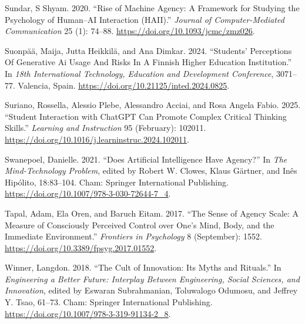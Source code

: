 \documentclass[
  letterpaper,
  DIV=11,
  numbers=noendperiod]{scrartcl}
\newlength{\cslhangindent}
\newenvironment{CSLReferences}[2] %
 {\begin{list}{}{%
  \setlength{\itemindent}{0pt}
  \setlength{\leftmargin}{0pt}
  \setlength{\parsep}{0pt}
  \ifodd #1
   \setlength{\leftmargin}{\cslhangindent}
   \setlength{\itemindent}{-1\cslhangindent}
  \fi
  \setlength{\itemsep}{#2\baselineskip}}}
 {\end{list}}
\begin{document}
\begin{CSLReferences}{1}{0}
Sundar, S Shyam. 2020. {``Rise of {Machine Agency}: {A Framework} for
{Studying} the {Psychology} of {Human}--{AI Interaction} ({HAII}).''}
\emph{Journal of Computer-Mediated Communication} 25 (1): 74--88.
\url{https://doi.org/10.1093/jcmc/zmz026}.

Suonpää, Maija, Jutta Heikkilä, and Ana Dimkar. 2024. {``Students'
{Perceptions Of Generative Ai Usage And Risks In A Finnish Higher
Education Institution}.''} In \emph{18th {International Technology},
{Education} and {Development Conference}}, 3071--77. Valencia, Spain.
\url{https://doi.org/10.21125/inted.2024.0825}.

Suriano, Rossella, Alessio Plebe, Alessandro Acciai, and Rosa Angela
Fabio. 2025. {``Student Interaction with {ChatGPT} Can Promote Complex
Critical Thinking Skills.''} \emph{Learning and Instruction} 95
(February): 102011.
\url{https://doi.org/10.1016/j.learninstruc.2024.102011}.

Swanepoel, Danielle. 2021. {``Does {Artificial Intelligence Have
Agency}?''} In \emph{The {Mind-Technology Problem}}, edited by Robert W.
Clowes, Klaus Gärtner, and Inês Hipólito, 18:83--104. Cham: Springer
International Publishing.
\url{https://doi.org/10.1007/978-3-030-72644-7_4}.

Tapal, Adam, Ela Oren, and Baruch Eitam. 2017. {``The Sense of Agency
Scale: A Measure of Consciously Perceived Control over One's Mind, Body,
and the Immediate Environment.''} \emph{Frontiers in Psychology} 8
(September): 1552. \url{https://doi.org/10.3389/fpsyg.2017.01552}.

Winner, Langdon. 2018. {``The {Cult} of {Innovation}: {Its Myths} and
{Rituals}.''} In \emph{Engineering a {Better Future}: {Interplay}
Between {Engineering}, {Social Sciences}, and {Innovation}}, edited by
Eswaran Subrahmanian, Toluwalogo Odumosu, and Jeffrey Y. Tsao, 61--73.
Cham: Springer International Publishing.
\url{https://doi.org/10.1007/978-3-319-91134-2_8}.

\end{CSLReferences}
\end{document}
